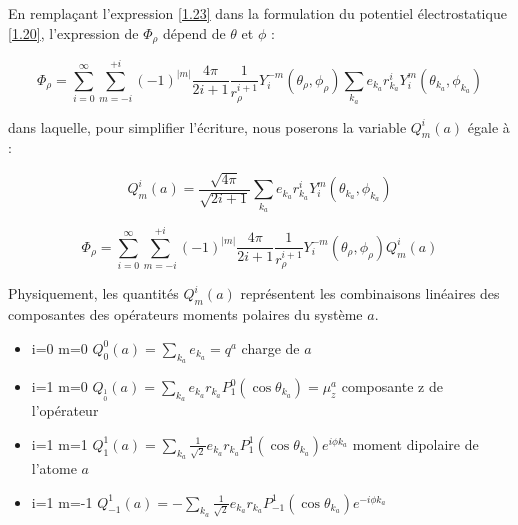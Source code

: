 	
	En remplaçant l'expression \ref{1.23} dans la formulation du potentiel électrostatique \ref{1.20}, l'expression de $\Phi_{\rho}$ dépend de $\theta$ et $\phi$ : 
	
	\begin{equation}
	\Phi_{\rho} = \sum_{i=0}^{\infty} \sum_{m=-i}^{+i} (-1)^{|m|}\frac{4\pi}{2i +1} \frac{1}{r_{\rho}^{i+1}} Y_{i}^{-m} (\theta_{\rho},\phi_{\rho}) \sum_{k_{a}} e_{k_{a}}r^{i}_{k_{a}} Y^{m}_{i} (\theta_{k_{a}}, \phi_{k_{a}})
	\end{equation}
	
	dans laquelle, pour simplifier l'écriture, nous poserons la variable $Q_{m}^{i}(a)$ égale à : 
	
	\begin{equation}
	Q_{m}^{i}(a)= \frac{\sqrt{4\pi}}{\sqrt{2i + 1}} \sum_{k_{a}} e_{k_{a}}r_{k_{a}}^{i} Y_{i}^{m} (\theta_{k_{a}}, \phi_{k_{a}}) \label{1.25}
	\end{equation}
	
	\begin{equation}
	\Phi_{\rho} = \sum_{i=0}^{\infty} \sum_{m=-i}^{+i} (-1)^{|m|} \frac{4\pi}{2i +1} \frac{1}{r_{\rho}^{i+1}} Y_{i}^{-m} (\theta_{\rho},\phi_{\rho})Q_{m}^{i}(a)
	\end{equation}
	
	Physiquement, les quantités $Q_{m}^{i}(a)$ représentent les combinaisons linéaires des composantes des opérateurs moments polaires du système $a$. 
	
	
	\begin{itemize}
		\item i=0 m=0 \hspace{0.9cm} $Q_{0}^{0}(a) = \sum_{k_{a}} e_{k_{a}} = q^{a}$ \hspace{3.5cm} charge de $a$
		
		\item i=1 m=0 \hspace{0.9cm} $Q_{_{0}^{1}}(a)= \sum_{k_{a}} e_{k_{a}} r_{k_{a}} P^{0}_{1} (\cos\theta_{k_{a}}) = \mu_{z}^{a}$ \hspace{1cm} composante z de l'opérateur
		
		\item i=1 m=1 \hspace{0.9cm} $Q_{1}^{1}(a)= \sum_{k_{a}} \frac{1}{\sqrt{2}}e_{k_{a}} r_{k_{a}} P^{1}_{1} (\cos\theta_{k_{a}}) e^{i\phi k_{a}}$ \hspace{0.6cm} moment dipolaire de l'atome $a$
		
		\item i=1 m=-1 \hspace{0.9cm} $Q_{-1}^{1}(a) = -\sum_{k_{a}} \frac{1}{\sqrt{2}}e_{k_{a}} r_{k_{a}} P^{1}_{-1} (\cos\theta_{k_{a}}) e^{-i\phi k_{a}}$
	\end{itemize}
	
